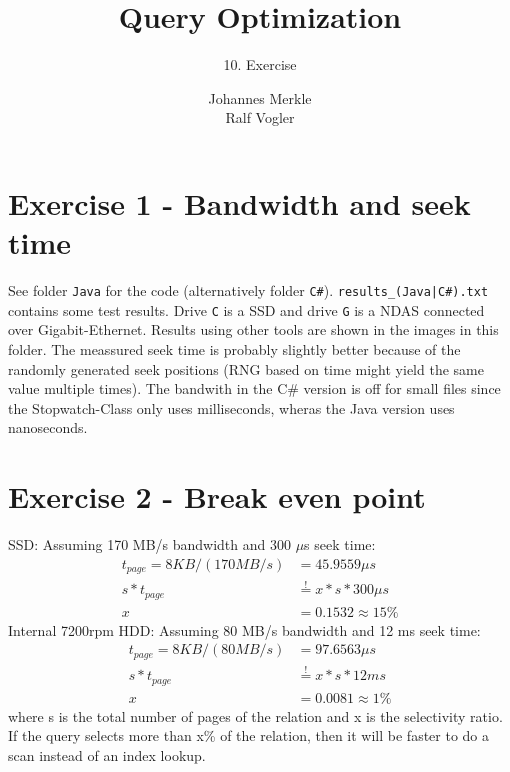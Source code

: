 \documentclass[11pt,a4paper]{scrartcl}
\begin{document}
\author{Johannes Merkle\\Ralf Vogler}
\title{Query Optimization}
\subtitle{10. Exercise}

\maketitle

\section*{Exercise 1 - Bandwidth and seek time}
See folder \verb|Java| for the code (alternatively folder \verb|C#|). \verb:results_(Java|C#).txt: contains some test results. Drive \verb|C| is a SSD and drive \verb|G| is a NDAS connected over Gigabit-Ethernet. Results using other tools are shown in the images in this folder. The meassured seek time is probably slightly better because of the randomly generated seek positions (RNG based on time might yield the same value multiple times). The bandwith in the C\# version is off for small files since the Stopwatch-Class only uses milliseconds, wheras the Java version uses nanoseconds.

%


\section*{Exercise 2 - Break even point}
SSD: Assuming 170 MB/s bandwidth and 300 $\mu$s seek time:
\begin{align*}
t_{page} = 8KB / (170 MB/s) &= 45.9559 \mu s\\
s * t_{page} &\stackrel{!}{=} x * s * 300\mu s\\
x &= 0.1532 \approx 15\%
\end{align*}
Internal 7200rpm HDD: Assuming 80 MB/s bandwidth and 12 ms seek time:
\begin{align*}
t_{page} = 8KB / (80 MB/s) &= 97.6563 \mu s\\
s * t_{page} &\stackrel{!}{=} x * s * 12ms\\
x &= 0.0081 \approx 1\%
\end{align*}
where s is the total number of pages of the relation and x is the selectivity ratio.
If the query selects more than x\% of the relation, then it will be faster to do a scan instead of an index lookup.
\end{document}
